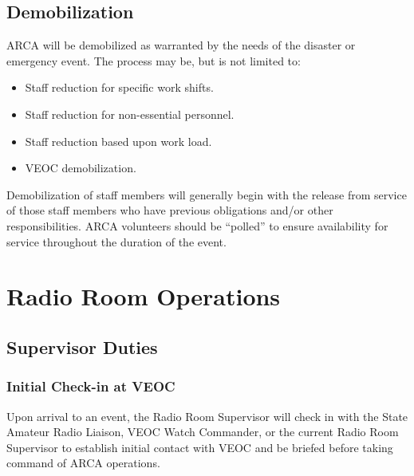 \documentclass[pdflatex,letterpaper,twoside,12pt]{book}
\begin{document}

\section{Demobilization}

ARCA will be demobilized as warranted by the needs of the disaster or emergency event.  The process may be, but is not limited to:

\begin{itemize}
	\item Staff reduction for specific work shifts.
	\item Staff reduction for non-essential personnel.
	\item Staff reduction based upon work load.
	\item VEOC demobilization.
\end{itemize}

Demobilization of staff members will generally begin with the release from service of those staff members who have previous obligations and/or other responsibilities.  ARCA volunteers should be “polled” to ensure availability for service throughout the duration of the event.


\chapter{Radio Room Operations}

\section{Supervisor Duties}

\subsection{Initial Check-in at VEOC}

Upon arrival to an event, the Radio Room Supervisor will check in with the State Amateur Radio Liaison, VEOC Watch Commander, or the current Radio Room Supervisor to establish initial contact with VEOC and be briefed before taking command of ARCA operations.
\end{document}
